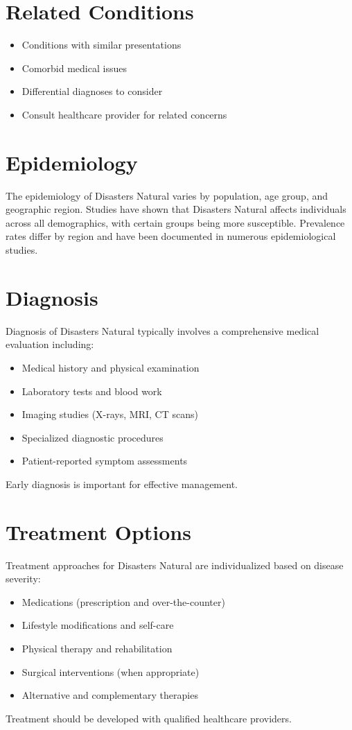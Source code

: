 \section*{Related Conditions}
\begin{itemize}
  \item Conditions with similar presentations
  \item Comorbid medical issues
  \item Differential diagnoses to consider
  \item Consult healthcare provider for related concerns
\end{itemize}

\section*{Epidemiology}
The epidemiology of Disasters Natural varies by population, age group, and geographic region. Studies have shown that Disasters Natural affects individuals across all demographics, with certain groups being more susceptible. Prevalence rates differ by region and have been documented in numerous epidemiological studies.

\section*{Diagnosis}
Diagnosis of Disasters Natural typically involves a comprehensive medical evaluation including:
\begin{itemize}
  \item Medical history and physical examination
  \item Laboratory tests and blood work
  \item Imaging studies (X-rays, MRI, CT scans)
  \item Specialized diagnostic procedures
  \item Patient-reported symptom assessments
\end{itemize}
Early diagnosis is important for effective management.

\section*{Treatment Options}
Treatment approaches for Disasters Natural are individualized based on disease severity:
\begin{itemize}
  \item Medications (prescription and over-the-counter)
  \item Lifestyle modifications and self-care
  \item Physical therapy and rehabilitation
  \item Surgical interventions (when appropriate)
  \item Alternative and complementary therapies
\end{itemize}
Treatment should be developed with qualified healthcare providers.

